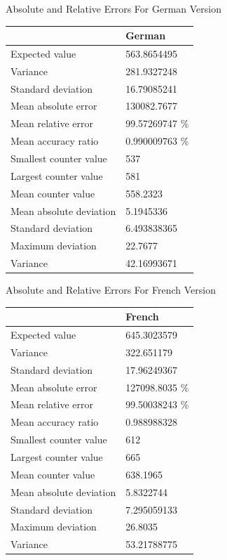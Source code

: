 \documentclass[]{revdetua}
\begin{document}
\begin{table}[!ht]
    \centering
    Absolute and Relative Errors For German Version\linebreak\linebreak
    \begin{tabular}{|l|l|}
    \hline
        ~ & German \\ \hline
        Expected value & 563.8654495 \\ \hline
        Variance & 281.9327248 \\ \hline
        Standard deviation & 16.79085241 \\ \hline
        Mean absolute error & 130082.7677 \\ \hline
        Mean relative error & 99.57269747 \% \\ \hline
        Mean accuracy ratio & 0.990009763 \% \\ \hline
        Smallest counter value & 537 \\ \hline
        Largest counter value & 581 \\ \hline
        Mean counter value & 558.2323 \\ \hline
        Mean absolute deviation & 5.1945336 \\ \hline
        Standard deviation & 6.493838365 \\ \hline
        Maximum deviation & 22.7677 \\ \hline
        Variance & 42.16993671 \\ \hline
    \end{tabular}
\end{table}

\begin{table}[!ht]
    \centering
    Absolute and Relative Errors For French Version\linebreak\linebreak
    \begin{tabular}{|l|l|}
    \hline
        ~ & French \\ \hline
        Expected value & 645.3023579 \\ \hline
        Variance & 322.651179 \\ \hline
        Standard deviation & 17.96249367 \\ \hline
        Mean absolute error & 127098.8035 \% \\ \hline
        Mean relative error & 99.50038243 \% \\ \hline
        Mean accuracy ratio & 0.988988328 \\ \hline
        Smallest counter value & 612 \\ \hline
        Largest counter value & 665 \\ \hline
        Mean counter value & 638.1965 \\ \hline
        Mean absolute deviation & 5.8322744 \\ \hline
        Standard deviation & 7.295059133 \\ \hline
        Maximum deviation & 26.8035 \\ \hline
        Variance & 53.21788775 \\ \hline
    \end{tabular}
\end{table}
\end{document}

